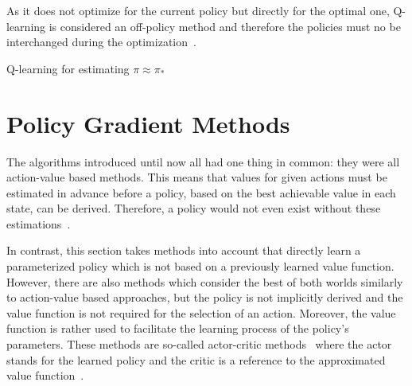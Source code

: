 \documentclass[draft,final]{vutinfth} %
\newcommand{\p}[1]{see p. #1}
\begin{document}
    As it does not optimize for the current policy but directly for the optimal one, Q-learning is considered an off-policy method and therefore the policies must no be interchanged during the optimization~\citep[\p{57}]{szepesvari_algorithms_2010}.

    \begin{algorithm}
        \caption[Q-learning for estimating $\pi \approx \pi_*$]{Q-learning for estimating $\pi \approx \pi_*$\protect\footnotemark}
        \label{alg:q_learning}

        \KwIn{Step size $\alpha \in (0,1]$, small $\epsilon > 0$}
        \;



    \end{algorithm}

    \footnotetext{\citep[\p{131}]{sutton_reinforcement_2018}}


    \section{Policy Gradient Methods}\label{sec:policy-gradient-methods}
    The algorithms introduced until now all had one thing in common: they were all action-value based methods.
    This means that values for given actions must be estimated in advance before a policy, based on the best achievable value in each state, can be derived.
    Therefore, a policy would not even exist without these estimations~\citep[\p{321}]{sutton_reinforcement_2018}.

    In contrast, this section takes methods into account that directly learn a parameterized policy which is not based on a previously learned value function.
    However, there are also methods which consider the best of both worlds similarly to action-value based approaches, but the policy is not implicitly derived and the value function is not required for the selection of an action.
    Moreover, the value function is rather used to facilitate the learning process of the policy's parameters.
    These methods are so-called actor-critic methods~ where the actor stands for the learned policy and the critic is a reference to the approximated value function~\citep[\p{321}]{sutton_reinforcement_2018}.
\end{document}
